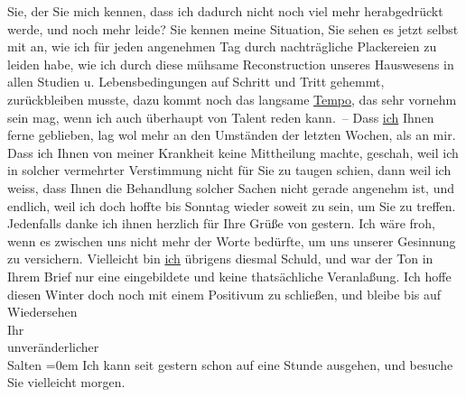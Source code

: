 \begin{ledgroupsized}[t]{13cm}
               Sie, der Sie mich kennen, dass ich dadurch nicht noch viel mehr herabgedrückt werde,
               und noch mehr leide? Sie kennen meine Situation, Sie sehen es jetzt selbst mit an,
               wie ich für jeden ange{\pb}nehmen Tag durch nachträgliche Plackereien zu leiden habe, wie ich durch diese
               mühsame Reconstruction unseres Hauswesens in allen Studien u. Lebensbedingungen auf
               Schritt und Tritt gehemmt, zurückbleiben musste, dazu kommt noch das langsame \uline{Tempo}, das sehr vornehm sein mag, wenn ich \introOben{}auch\introOben{} überhaupt von Talent reden kann. –\pend
           \pstart
           Dass \uline{ich} Ihnen ferne geblieben, lag wol mehr an den
               Umständen der letzten Wochen, als an mir. Dass ich Ihnen von meiner Krankheit keine
               Mittheilung machte, geschah, weil ich in solcher vermehrter {\pb}Verstimmung nicht für Sie zu
               taugen schien, dann weil ich weiss, dass Ihnen die Behandlung solcher Sachen nicht
               gerade angenehm ist, und endlich, weil ich doch hoffte bis Sonntag
               wieder soweit zu sein, um Sie zu treffen. \pend
           \pstart
           Jedenfalls danke ich ihnen herzlich für Ihre Grüße von gestern. Ich wäre froh, wenn
               es zwischen uns nicht mehr der Worte bedürfte, um uns unserer Gesinnung zu
               versichern. Vielleicht bin \uline{ich} übrigens diesmal
               Schuld, und war der Ton in Ihrem Brief nur eine eingebildete und keine thatsächliche
               Veranlaßung. \pend
           \pstart
           Ich hoffe diesen Winter doch noch mit einem Positivum zu schließen, und bleibe
               bis auf Wiedersehen {\\[\baselineskip]}Ihr {\\[\baselineskip]}unveränderlicher {\\[\baselineskip]}\spacefill\mbox{Salten}\pend
           \leftskip=0em{}\pstart
           \noindent{}Ich kann seit gestern schon auf eine Stunde ausgehen, und besuche Sie vielleicht
                  morgen. \pend
           
         
         \endnumbering{}\end{ledgroupsized}\begin{anhang}\end{anhang}\newcommand{\dateiname}{L03132}\newcommand{\titel}{Felix Salten an Arthur Schnitzler, [24. 1. 1894]}\newcommand{\editorInnen}{Martin Anton Müller und Laura Untner}
      